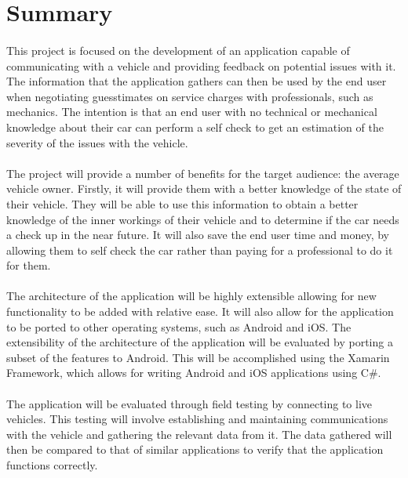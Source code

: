 \section{Summary}
	\paragraph{}{
	This project is focused on the development of an application capable of communicating with a vehicle and providing feedback on potential issues with it. The information that the application gathers can then be used by the end user when negotiating guesstimates on service charges with professionals, such as mechanics. The intention is that an end user with no technical or mechanical knowledge about their car can perform a self check to get an estimation of the severity of the issues with the vehicle. %
	}
	\paragraph{}{
	The project will provide a number of benefits for the target audience: the average vehicle owner. Firstly, it will provide them with a better knowledge of the state of their vehicle. They will be able to use this information to obtain a better knowledge of the inner workings of their vehicle and to determine if the car needs a check up in the near future. It will also save the end user time and money, by allowing them to self check the car rather than paying for a professional to do it for them.
	}
	\paragraph{}
	{
	The architecture of the application will be highly extensible allowing for new functionality to be added with relative ease. It will also allow for the application to be ported to other operating systems, such as Android and iOS. The extensibility of the architecture of the application will be evaluated by porting a subset of the features to Android. This will be accomplished using the Xamarin Framework, which allows for writing Android and iOS applications using C{\#}.
	}
	\paragraph{}
	{
	The application will be evaluated through field testing by connecting to live vehicles. This testing will involve establishing and maintaining communications with the vehicle and gathering the relevant data from it. The data gathered will then be compared to that of similar applications to verify that the application functions correctly.
	}
	
